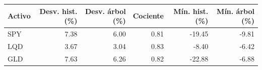 {\small
\begin{tabular}{lrrrrr}
\toprule
Activo & Desv. hist. (\%) & Desv. árbol (\%) & Cociente & Mín. hist. (\%) & Mín. árbol (\%) \\
\midrule
SPY & 7.38 & 6.00 & 0.81 & -19.45 & -9.81 \\
LQD & 3.67 & 3.04 & 0.83 & -8.40 & -6.42 \\
GLD & 7.63 & 6.26 & 0.82 & -22.88 & -6.88 \\
\bottomrule
\end{tabular}
}
